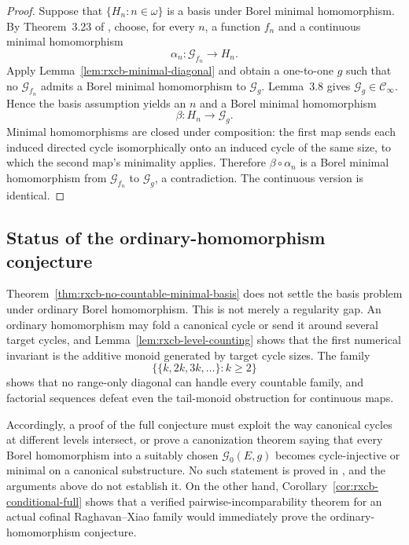 \begin{proof}
Suppose that $\{H_n:n\in\omega\}$ is a basis under Borel minimal
homomorphism.  By Theorem~3.23 of \cite{RX24}, choose, for every $n$, a
function $f_n$ and a continuous minimal homomorphism
\[
  \alpha_n:\mathcal G_{f_n}\longrightarrow H_n.
\]
Apply Lemma~\ref{lem:rxcb-minimal-diagonal} and obtain a one-to-one $g$
such that no $\mathcal G_{f_n}$ admits a Borel minimal homomorphism to
$\mathcal G_g$.  Lemma~3.8 gives
$\mathcal G_g\in\mathcal C_\infty$.  Hence the basis assumption yields
an $n$ and a Borel minimal homomorphism
\[
  \beta:H_n\longrightarrow\mathcal G_g.
\]
Minimal homomorphisms are closed under composition: the first map
sends each induced directed cycle isomorphically onto an induced cycle
of the same size, to which the second map's minimality applies.
Therefore $\beta\circ\alpha_n$ is a Borel minimal homomorphism from
$\mathcal G_{f_n}$ to $\mathcal G_g$, a contradiction.  The continuous
version is identical.
\end{proof}

\subsection{Status of the ordinary-homomorphism conjecture}
\label{subsec:rxcb-status}

Theorem~\ref{thm:rxcb-no-countable-minimal-basis} does not settle the
basis problem under ordinary Borel homomorphism.  This is not merely a
regularity gap.  An ordinary homomorphism may fold a canonical cycle
or send it around several target cycles, and
Lemma~\ref{lem:rxcb-level-counting} shows that the first numerical
invariant is the additive monoid generated by target cycle sizes.
The family
\[
  \bigl\{\{k,2k,3k,\dots\}:k\geq2\bigr\}
\]
shows that no range-only diagonal can handle every countable family,
and factorial sequences defeat even the tail-monoid obstruction for
continuous maps.

Accordingly, a proof of the full conjecture must exploit the way
canonical cycles at different levels intersect, or prove a
canonization theorem saying that every Borel homomorphism into a
suitably chosen $\mathcal G_0(E,g)$ becomes cycle-injective or minimal
on a canonical substructure.  No such statement is proved in
\cite{RX24}, and the arguments above do not establish it.  On the
other hand, Corollary~\ref{cor:rxcb-conditional-full} shows that a
verified pairwise-incomparability theorem for an actual cofinal
Raghavan--Xiao family would immediately prove the ordinary-homomorphism
conjecture.
